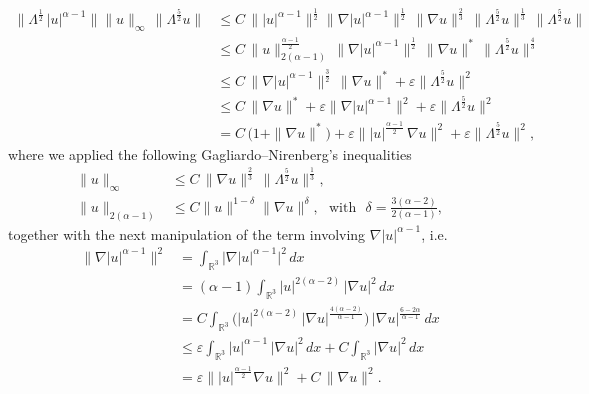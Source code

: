 \documentclass[a4paper]{article}
\begin{document}
\begin{equation*}
  \begin{aligned}
    \|\Lambda^{\frac{1}{2}}\,|u|^{\alpha-1}\|\|u\|_\infty \,
    \|\Lambda^{\frac{5}{2}}u\|&\le C\,\|
    |u|^{\alpha-1}\|^{\frac{1}{2}} \|\nabla
    |u|^{\alpha-1}\|^{\frac{1}{2}} \,\|\nabla
    u\|^\frac23\,\|\Lambda^\frac52 u\|^\frac13\,
    \|\Lambda^{\frac{5}{2}}u\|
    \\
    & \leq C\, \|u\|_{2(\alpha-1)}^\frac{\alpha-1}{2}\, \|\nabla
    |u|^{\alpha-1}\|^\frac12\, \|\nabla u\|^*\, \|\Lambda^\frac52
    u\|^\frac{4}{3}
    \\
    & \leq C\, \|\nabla |u|^{\alpha-1}\|^\frac32\, \|\nabla u\|^*+
    \varepsilon \|\Lambda^\frac52 u\|^2
    \\
    & \leq C\, \|\nabla u\|^*+ \varepsilon \|\nabla
    |u|^{\alpha-1}\|^2+ \varepsilon \|\Lambda^\frac52 u\|^2
    \\
    & = C\,\big(1+ \|\nabla u\|^*\big)+ \varepsilon
    \||u|^{\frac{\alpha-1}{2}}\, \nabla u\|^2+ \varepsilon
    \|\Lambda^\frac52 u\|^2,
%
  \end{aligned}
\end{equation*}
where we applied the following Gagliardo--Nirenberg's inequalities
%
\begin{equation*}
  \begin{aligned}
    \|u\|_\infty &\le C\, \|\nabla u\|^\frac23\, \|\Lambda^\frac52
    u\|^\frac13,
    \\
    \|u\|_{2(\alpha-1)}&\leq C \|u\|^{1-\delta}\|\nabla
    u\|^\delta,\,\, \textrm{ with }\,\, \delta =
    \frac{3(\alpha-2)}{2(\alpha-1)},
  \end{aligned}
\end{equation*}
together with the next manipulation of the term involving
$\nabla |u|^{\alpha-1}$, i.e.
%
\begin{equation*}
  \begin{aligned}
    \|\nabla |u|^{\alpha-1}\|^2 &= \int_{\mathbb{R}^3} \big|\nabla
    |u|^{\alpha-1}\big|^2\,dx
    \\
    &= (\alpha-1)\int_{\mathbb{R}^3}|u|^{2(\alpha-2)}\,|\nabla u|^2\,
    dx
    \\
    & =C\int_{\mathbb{R}^3} \big(|u|^{2(\alpha-2)}\, |\nabla
    u|^{\frac{4(\alpha-2)}{\alpha-1}}\big)\,|\nabla
    u|^\frac{6-2\alpha}{\alpha-1}\,dx
    \\
    &\le \varepsilon\int_{\mathbb{R}^3}|u|^{\alpha-1}\, |\nabla
    u|^2\,dx + C\int_{\mathbb{R}^3} |\nabla u|^{2}\, dx
    \\
    &=\varepsilon \||u|^{\frac{\alpha-1}{2}}\nabla u\|^2 + C\,
    \|\nabla u\|^2.
  \end{aligned}
\end{equation*}
\end{document}
